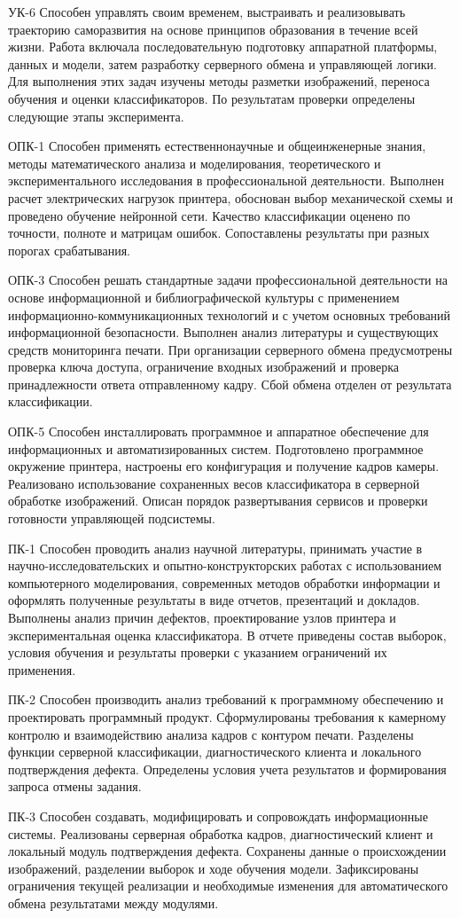 УК-6 Способен управлять своим временем, выстраивать и реализовывать траекторию саморазвития на основе принципов образования в течение всей жизни. Работа включала последовательную подготовку аппаратной платформы, данных и модели, затем разработку серверного обмена и управляющей логики. Для выполнения этих задач изучены методы разметки изображений, переноса обучения и оценки классификаторов. По результатам проверки определены следующие этапы эксперимента.

ОПК-1 Способен применять естественнонаучные и общеинженерные знания, методы математического анализа и моделирования, теоретического и экспериментального исследования в профессиональной деятельности. Выполнен расчет электрических нагрузок принтера, обоснован выбор механической схемы и проведено обучение нейронной сети. Качество классификации оценено по точности, полноте и матрицам ошибок. Сопоставлены результаты при разных порогах срабатывания.

ОПК-3 Способен решать стандартные задачи профессиональной деятельности на основе информационной и библиографической культуры с применением информационно-коммуникационных технологий и с учетом основных требований информационной безопасности. Выполнен анализ литературы и существующих средств мониторинга печати. При организации серверного обмена предусмотрены проверка ключа доступа, ограничение входных изображений и проверка принадлежности ответа отправленному кадру. Сбой обмена отделен от результата классификации.

ОПК-5 Способен инсталлировать программное и аппаратное обеспечение для информационных и автоматизированных систем. Подготовлено программное окружение принтера, настроены его конфигурация и получение кадров камеры. Реализовано использование сохраненных весов классификатора в серверной обработке изображений. Описан порядок развертывания сервисов и проверки готовности управляющей подсистемы.

ПК-1 Способен проводить анализ научной литературы, принимать участие в научно-исследовательских и опытно-конструкторских работах с использованием компьютерного моделирования, современных методов обработки информации и оформлять полученные результаты в виде отчетов, презентаций и докладов. Выполнены анализ причин дефектов, проектирование узлов принтера и экспериментальная оценка классификатора. В отчете приведены состав выборок, условия обучения и результаты проверки с указанием ограничений их применения.

ПК-2 Способен производить анализ требований к программному обеспечению и проектировать программный продукт. Сформулированы требования к камерному контролю и взаимодействию анализа кадров с контуром печати. Разделены функции серверной классификации, диагностического клиента и локального подтверждения дефекта. Определены условия учета результатов и формирования запроса отмены задания.

ПК-3 Способен создавать, модифицировать и сопровождать информационные системы. Реализованы серверная обработка кадров, диагностический клиент и локальный модуль подтверждения дефекта. Сохранены данные о происхождении изображений, разделении выборок и ходе обучения модели. Зафиксированы ограничения текущей реализации и необходимые изменения для автоматического обмена результатами между модулями.
